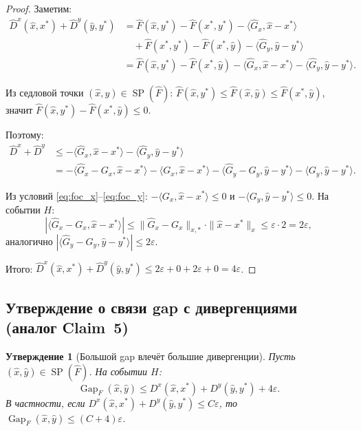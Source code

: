\documentclass[12pt,a4paper]{article}
\theoremstyle{plain}
\newtheorem{claim}[theorem]{Утверждение}
\theoremstyle{definition}
\DeclareMathOperator{\Gap}{Gap}
\DeclareMathOperator{\SP}{SP}
\newcommand{\hatF}{\hat{F}}
\newcommand{\hatD}{\hat{D}}
\newcommand{\hatG}{\hat{G}}
\begin{document}
\begin{proof}
Заметим:
\begin{align*}
    \hatD^x(\hat{x},x^*)+\hatD^y(\hat{y},y^*)
    &=\hatF(\hat{x},y^*)-\hatF(x^*,y^*)-\langle\hatG_x,\hat{x}-x^*\rangle\\
    &\quad+\hatF(x^*,y^*)-\hatF(x^*,\hat{y})-\langle\hatG_y,\hat{y}-y^*\rangle\\
    &=\hatF(\hat{x},y^*)-\hatF(x^*,\hat{y})-\langle\hatG_x,\hat{x}-x^*\rangle-\langle\hatG_y,\hat{y}-y^*\rangle.
\end{align*}

Из седловой точки $(\hat{x},\hat{y})\in\SP(\hatF)$: $\hatF(\hat{x},y^*)\le\hatF(\hat{x},\hat{y})\le\hatF(x^*,\hat{y})$, значит $\hatF(\hat{x},y^*)-\hatF(x^*,\hat{y})\le 0$.

Поэтому:
\begin{align*}
    \hatD^x+\hatD^y
    &\le-\langle\hatG_x,\hat{x}-x^*\rangle-\langle\hatG_y,\hat{y}-y^*\rangle\\
    &=-\langle\hatG_x-G_x,\hat{x}-x^*\rangle-\langle G_x,\hat{x}-x^*\rangle-\langle\hatG_y-G_y,\hat{y}-y^*\rangle-\langle G_y,\hat{y}-y^*\rangle.
\end{align*}

Из условий \eqref{eq:foc_x}--\eqref{eq:foc_y}: $-\langle G_x,\hat{x}-x^*\rangle\le 0$ и $-\langle G_y,\hat{y}-y^*\rangle\le 0$. На событии $H$:
\[
    |\langle\hatG_x-G_x,\hat{x}-x^*\rangle|\le\|\hatG_x-G_x\|_{x,*}\cdot\|\hat{x}-x^*\|_x\le\varepsilon\cdot 2=2\varepsilon,
\]
аналогично $|\langle\hatG_y-G_y,\hat{y}-y^*\rangle|\le 2\varepsilon$.

Итого: $\hatD^x(\hat{x},x^*)+\hatD^y(\hat{y},y^*)\le 2\varepsilon+0+2\varepsilon+0=4\varepsilon$.
\end{proof}

\subsection{Утверждение о связи gap с дивергенциями (аналог Claim~5)}

\begin{claim}[Большой gap влечёт большие дивергенции]
\label{claim:saddle_claim5}
Пусть $(\hat{x},\hat{y})\in\SP(\hatF)$. На событии $H$:
\[
    \Gap_F(\hat{x},\hat{y})\le D^x(\hat{x},x^*)+D^y(\hat{y},y^*)+4\varepsilon.
\]
В частности, если $D^x(\hat{x},x^*)+D^y(\hat{y},y^*)\le C\varepsilon$, то $\Gap_F(\hat{x},\hat{y})\le(C+4)\varepsilon$.
\end{claim}
\end{document}
